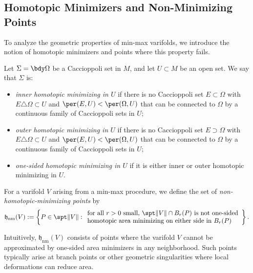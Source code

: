 \subsection{Homotopic Minimizers and Non-Minimizing Points}

To analyze the geometric properties of min-max varifolds, we introduce the notion of homotopic
minimizers and points where this property fails.

\begin{definition}\label{def:homotopic-minimizer}
Let $\Sigma = \bdy\Omega$ be a Caccioppoli set in $M$, and let $U \subset M$ be an open set. We say
that $\Sigma$ is:
\begin{itemize}
    \item \emph{inner homotopic minimizing in $U$} if there is no Caccioppoli set $E \subset \Omega$
    with $E \triangle \Omega \subset U$ and $\per(E, U) < \per(\Omega, U)$ that can be connected to
    $\Omega$ by a continuous family of Caccioppoli sets in $U$;
    \item \emph{outer homotopic minimizing in $U$} if there is no Caccioppoli set $E \supset \Omega$
    with $E \triangle \Omega \subset U$ and $\per(E, U) < \per(\Omega, U)$ that can be connected to
    $\Omega$ by a continuous family of Caccioppoli sets in $U$;
    \item \emph{one-sided homotopic minimizing in $U$} if it is either inner or outer homotopic
    minimizing in $U$.
\end{itemize}
\end{definition}

\begin{definition}\label{def:hnm}
For a varifold $V$ arising from a min-max procedure, we define the set of \emph{non-homotopic-minimizing
points} by
\[
    \mathfrak{h}_{\mathrm{nm}}(V) := \left\{P \in \spt\|V\| : \begin{array}{l}
        \text{for all $r > 0$ small, $\spt\|V\| \cap B_r(P)$ is not one-sided} \\
        \text{homotopic area minimizing on either side in $B_r(P)$}
    \end{array}\right\}.
\]
\end{definition}

Intuitively, $\mathfrak{h}_{\mathrm{nm}}(V)$ consists of points where the varifold $V$ cannot be
approximated by one-sided area minimizers in any neighborhood. Such points typically arise at branch
points or other geometric singularities where local deformations can reduce area.

